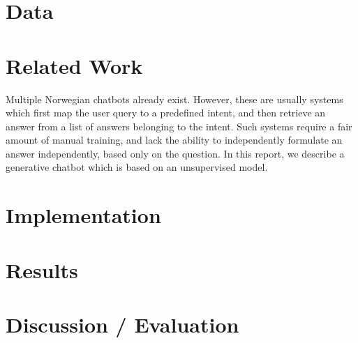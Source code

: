 \documentclass{article}
\begin{document}
\section{Data}


\section{Related Work}

Multiple Norwegian chatbots already exist. However, these are usually systems which first map
the user query to a predefined intent, and then retrieve an answer from a list of answers
belonging to the intent. Such systems require a fair amount of manual training, and lack
the ability to independently formulate an answer independently, based only on the question.
In this report, we describe a generative chatbot which is based on an unsupervised model.

\section{Implementation}


\section{Results}


\section{Discussion / Evaluation}

\end{document}
